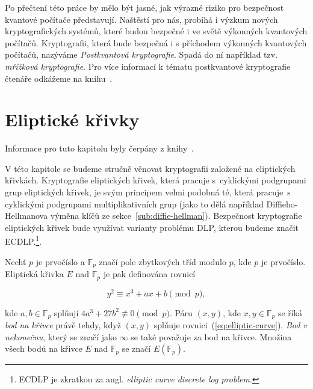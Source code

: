 \documentclass[
  program=infoi,
  biblatex=false,
  figures=true,
  glossaries,
  tables=false,
  sourcecodes=true,
  index
]{kidiplom}
\begin{document}
        Po přečtení této práce by mělo být jasné, jak výrazné riziko pro bezpečnost kvantové počítače představují.
        Naštěstí pro nás, probíhá i výzkum nových kryptografických systémů, které budou bezpečné i ve světě
        výkonných kvantových počítačů.
        Kryptografii, která bude bezpečná i s příchodem výkonných kvantových počítačů, nazýváme \emph{Postkvantová kryptografie}.
        Spadá do ní například tzv. \emph{mřížková kryptografie}.
        Pro více informací k tématu postkvantové kryptografie čtenáře odkážeme na knihu~\cite{theory-and-practice}.

        \newpage


\section{Eliptické křivky}\label{sec:elliptic-curves}

    Informace pro tuto kapitolu byly čerpány z knihy~\cite{guide-elliptic-curve}.

    V této kapitole se budeme stručně věnovat kryptografii založené na eliptických křivkách.
    Kryptografie eliptických křivek, která pracuje s~cyklickými podgrupami grup eliptických křivek, je svým principem
    velmi podobná té, která pracuje~s cyklickými podgrupami multiplikativních grup (jako to dělá například Diffieho-Hellmanova výměna
    klíčů ze sekce~\ref{sub:diffie-hellman}).
    Bezpečnost kryptografie eliptických křivek bude využívat varianty problému DLP, kterou
    budeme značit ECDLP.\footnote{ECDLP je zkratkou za angl. \emph{elliptic curve discrete log problem}.}.

    \begin{definition}\label{def:elliptic-curve-over-fp}

        Nechť $p$ je prvočíslo a $\mathbb{F}_p$ značí pole zbytkových tříd modulo $p$, kde $p$ je prvočíslo.
        Eliptická křivka $E$ nad $\mathbb{F}_p$ je pak definována rovnicí

            \begin{equation}\label{eq:elliptic-curve}
                y^2 \equiv x^3 + ax + b \pmod{p},
            \end{equation}
              

        \noindent
        kde $a, b \in \mathbb{F}_p$ splňují $4a^3 + 27b^2 \not\equiv 0 \pmod{p}$.
        Páru $(x,y)$, kde $x, y \in \mathbb{F}_p$ se říká \emph{bod na křivce} právě tehdy, když $(x,y)$ splňuje rovnici~(\ref{eq:elliptic-curve}).
        \emph{Bod v nekonečnu}, který se značí jako $\infty$ se také považuje za bod na křivce.
        Množina všech bodů na křivce $E$ nad $\mathbb{F}_p$ se značí $E(\mathbb{F}_p)$.

    \end{definition}
\end{document}
